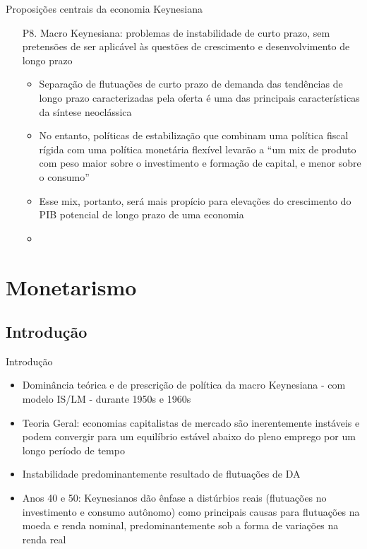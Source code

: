 \documentclass[10pt]{beamer}
\begin{document}
\begin{frame}{Proposições centrais da economia Keynesiana}
    \begin{enumerate}
        \item[P8.] Macro Keynesiana: problemas de instabilidade de curto prazo, sem pretensões de ser aplicável às questões de crescimento e desenvolvimento de longo prazo
        \bigskip
        \begin{itemize}
            \item Separação de flutuações de curto prazo de demanda das tendências de longo prazo caracterizadas pela oferta é uma das principais características da síntese neoclássica
            \medskip
            \item No entanto, políticas de estabilização que combinam uma política fiscal rígida com uma política monetária flexível levarão a ``um mix de produto com peso maior sobre o investimento e formação de capital, e menor sobre o consumo''
            \medskip
            \item Esse mix, portanto, será mais propício para elevações do crescimento do PIB potencial de longo prazo de uma economia
            \medskip
            \item {}
        \end{itemize}
    \end{enumerate}
\end{frame}

\section{Monetarismo}
\subsection{Introdução}
\begin{frame}{Introdução}
    \begin{itemize}
        \item Dominância teórica e de prescrição de política da macro Keynesiana - com modelo IS/LM - durante 1950s e 1960s
        \bigskip
        \item Teoria Geral: economias capitalistas de mercado são inerentemente instáveis e podem convergir para um equilíbrio estável abaixo do pleno emprego por um longo período de tempo
        \bigskip
        \item Instabilidade predominantemente resultado de flutuações de DA
        \bigskip
        \item Anos 40 e 50: Keynesianos dão ênfase a distúrbios reais (flutuações no investimento e consumo autônomo) como principais causas para flutuações na moeda e renda nominal, predominantemente sob a forma de variações na renda real
    \end{itemize}
\end{frame}
\end{document}
